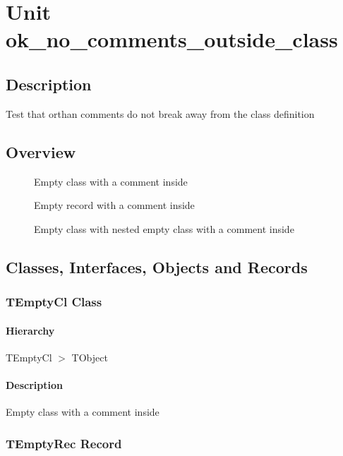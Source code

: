 \documentclass{report}
\begin{document}
\newlength{\tmplength}
\chapter{Unit ok{\_}no{\_}comments{\_}outside{\_}class}
\section{Description}
Test that orthan comments do not break away from the class definition
\section{Overview}
\begin{description}
\item[\texttt{\begin{ttfamily}TEmptyCl\end{ttfamily} Class}]Empty class with a comment inside
\item[\texttt{\begin{ttfamily}TEmptyRec\end{ttfamily} Record}]Empty record with a comment inside
\item[\texttt{\begin{ttfamily}TEmptyClWithNested\end{ttfamily} Class}]Empty class with nested empty class with a comment inside
\end{description}
\section{Classes, Interfaces, Objects and Records}
\subsection*{TEmptyCl Class}
\subsubsection*{\large{\textbf{Hierarchy}}\normalsize\hspace{1ex}\hfill}
TEmptyCl {$>$} TObject
\subsubsection*{\large{\textbf{Description}}\normalsize\hspace{1ex}\hfill}
Empty class with a comment inside\subsection*{TEmptyRec Record}
\end{document}
